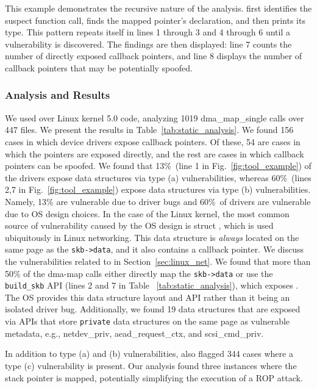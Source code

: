This example demonstrates the recursive nature of the analysis.
\tool first identifies the suspect function call, finds the mapped pointer's declaration, and then prints its type. This pattern repeats itself in lines 1 through 3 and 4 through 6 until a vulnerability is discovered. The findings are then displayed: line 7 counts the number of directly exposed callback pointers, and line 8 displays the number of callback pointers that may be potentially spoofed.



\subsubsection{Analysis and Results}
We used \tool over Linux kernel 5.0 code,
analyzing 1019 dma\_map\_single calls over 447 files. We present the results in Table~\ref{tab:static_analysis}. 
We found 156 cases in which device drivers expose callback pointers. Of these, 54 are cases in which the pointers are exposed directly, and the rest are cases in which callback pointers can be spoofed.
We found that 13\%~(line 1 in Fig.~\ref{fig:tool_example}) of the drivers expose data structures via type (a) vulnerabilities, whereas 60\%~(lines 2,7 in Fig.~\ref{fig:tool_example}) expose data structures via type (b) vulnerabilities. Namely, 13\% are vulnerable due to driver bugs and 60\%~of drivers are vulnerable due to OS design choices. In the case of the Linux kernel, the most common source of vulnerability caused by the OS design is struct \shinfo, which is used ubiquitously in Linux networking. This data structure is \textit{always} located on the same page as the \texttt{skb->data}, and it also contains a callback pointer. We discuss the vulnerabilities related to \shinfo in Section~\ref{sec:linux_net}. We found that more than 50\% of the dma-map calls either directly map the \texttt{skb->data} or use the \texttt{build\_skb} API (lines 2 and 7 in Table ~\ref{tab:static_analysis}), which exposes \shinfo. The OS provides this data structure layout and API rather than it being an isolated driver bug. Additionally, we found 19 data structures that are exposed via APIs that store \texttt{private} data structures on the same page as vulnerable metadata, e.g., netdev\_priv, aead\_request\_ctx, and scsi\_cmd\_priv.

In addition to type (a) and (b) vulnerabilities, \tool also flagged 344 cases where a type (c) vulnerability is present. Our analysis found three instances where the stack pointer is mapped, potentially simplifying the execution of a ROP attack.

